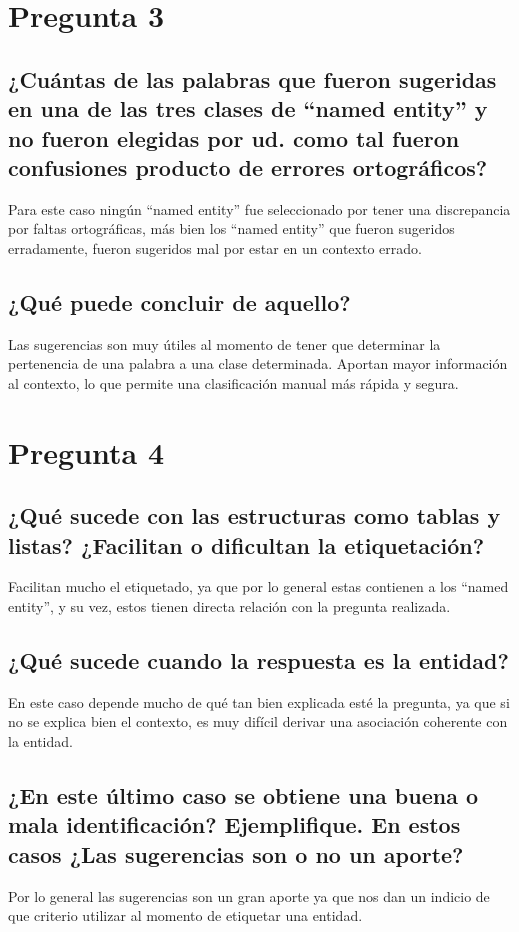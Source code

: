 \documentclass{article}
\begin{document}
\section{Pregunta 3}
\subsection{¿Cuántas de las palabras que fueron sugeridas en una de las tres clases de ``named entity'' y no fueron elegidas por ud. como tal fueron confusiones producto de errores ortográficos?}
Para este caso ningún ``named entity'' fue seleccionado por tener una discrepancia por faltas ortográficas, más bien los ``named entity'' que fueron sugeridos erradamente, fueron sugeridos mal por estar en un contexto errado.

\subsection{¿Qué puede concluir de aquello?}
Las sugerencias son muy útiles al momento de tener que determinar la pertenencia de una palabra a una clase determinada. Aportan mayor información al contexto, lo que permite una clasificación manual más rápida y segura.


\section{Pregunta 4}
\subsection{¿Qué sucede con las estructuras como tablas y listas? ¿Facilitan o dificultan la etiquetación?}
Facilitan mucho el etiquetado, ya que por lo general estas contienen a los ``named entity'', y su vez, estos tienen directa relación con la pregunta realizada.

\subsection{¿Qué sucede cuando la respuesta es la entidad?}
En este caso depende mucho de qué tan bien explicada esté la pregunta, ya que si no se explica bien el contexto, es muy difícil derivar una asociación coherente con la entidad.

\subsection{¿En este último caso se obtiene una buena o mala identificación? Ejemplifique. En estos casos ¿Las sugerencias son o no un aporte?}
Por lo general las sugerencias son un gran aporte ya que nos dan un indicio de que criterio utilizar al momento de etiquetar una entidad.
\end{document}
